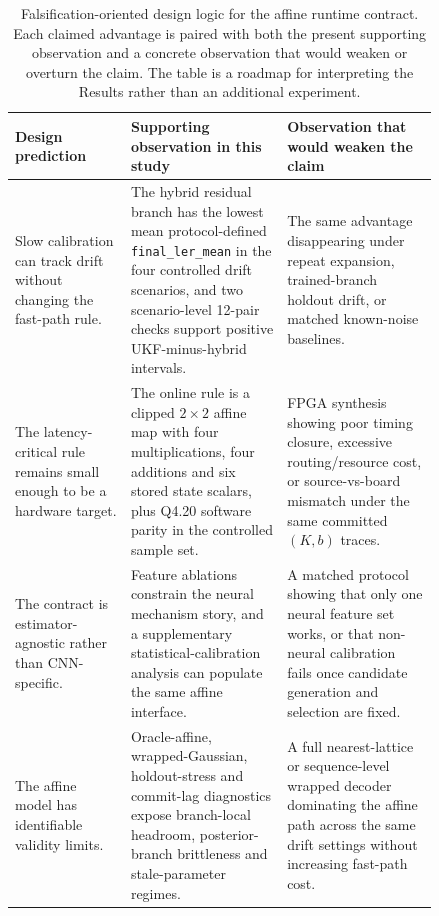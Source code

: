 \documentclass[11pt]{article}
\newcommand{\finalLER}{\texttt{final\_ler\_mean}}
\begin{document}
\begin{table}[t]
\centering
\small
\begin{tabular}{@{}>{\raggedright\arraybackslash}p{0.23\linewidth}>{\raggedright\arraybackslash}p{0.31\linewidth}>{\raggedright\arraybackslash}p{0.30\linewidth}@{}}
\toprule
Design prediction & Supporting observation in this study & Observation that would weaken the claim \\
\midrule
Slow calibration can track drift without changing the fast-path rule. &
The hybrid residual branch has the lowest mean protocol-defined \finalLER{} in
the four controlled drift scenarios, and two scenario-level 12-pair checks
support positive UKF-minus-hybrid intervals. &
The same advantage disappearing under repeat expansion, trained-branch holdout
drift, or matched known-noise baselines. \\
\addlinespace
The latency-critical rule remains small enough to be a hardware target. &
The online rule is a clipped \(2\times2\) affine map with four multiplications,
four additions and six stored state scalars, plus Q4.20 software parity in the
controlled sample set. &
FPGA synthesis showing poor timing closure, excessive routing/resource cost, or
source-vs-board mismatch under the same committed \((K,b)\) traces. \\
\addlinespace
The contract is estimator-agnostic rather than CNN-specific. &
Feature ablations constrain the neural mechanism story, and a supplementary
statistical-calibration analysis can populate the same affine interface. &
A matched protocol showing that only one neural feature set works, or that
non-neural calibration fails once candidate generation and selection are fixed. \\
\addlinespace
The affine model has identifiable validity limits. &
Oracle-affine, wrapped-Gaussian, holdout-stress and commit-lag diagnostics expose
branch-local headroom, posterior-branch brittleness and stale-parameter regimes. &
A full nearest-lattice or sequence-level wrapped decoder dominating the affine
path across the same drift settings without increasing fast-path cost. \\
\bottomrule
\end{tabular}
\caption{Falsification-oriented design logic for the affine runtime contract.
Each claimed advantage is paired with both the present supporting observation
and a concrete observation that would weaken or overturn the claim.  The table
is a roadmap for interpreting the Results rather than an additional experiment.}
\label{tab:falsification-design}
\end{table}
\end{document}

